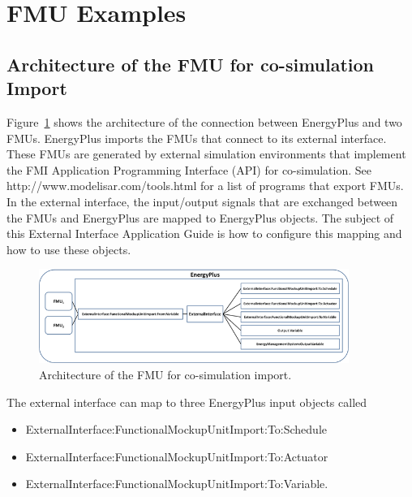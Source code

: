 \section{FMU Examples}\label{fmu-examples}

\subsection{Architecture of the FMU for co-simulation Import}\label{architecture-of-the-fmu-for-co-simulation-import}

Figure~\ref{fig:architecture-of-the-fmu-for-co-simulation} shows the architecture of the connection between EnergyPlus and two FMUs. EnergyPlus imports the FMUs that connect to its external interface. These FMUs are generated by external simulation environments that implement the FMI Application Programming Interface (API) for co-simulation. See http://www.modelisar.com/tools.html for a list of programs that export FMUs. In the external interface, the input/output signals that are exchanged between the FMUs and EnergyPlus are mapped to EnergyPlus objects. The subject of this External Interface Application Guide is how to configure this mapping and how to use these objects.

\begin{figure}[hbtp] %
\centering
\includegraphics[width=0.9\textwidth, height=0.9\textheight, keepaspectratio=true]{media/image035.png}
\caption{Architecture of the FMU for co-simulation import. \protect \label{fig:architecture-of-the-fmu-for-co-simulation}}
\end{figure}

The external interface can map to three EnergyPlus input objects called

\begin{itemize}
\item
  ExternalInterface:FunctionalMockupUnitImport:To:Schedule
\item
  ExternalInterface:FunctionalMockupUnitImport:To:Actuator
\item
  ExternalInterface:FunctionalMockupUnitImport:To:Variable.
\end{itemize}

